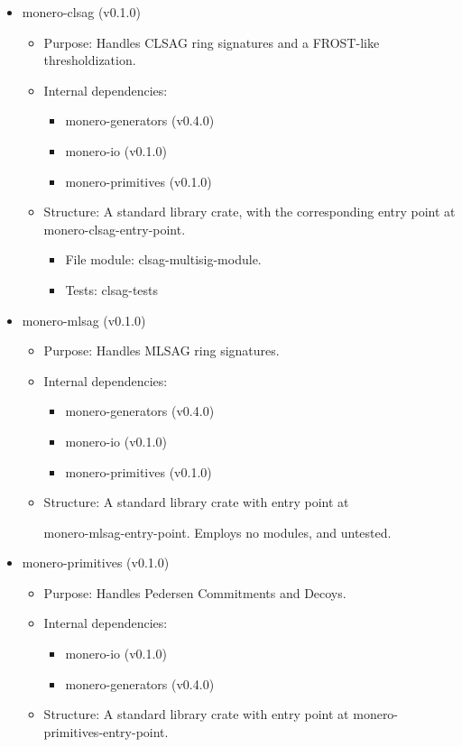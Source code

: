 \begin{itemize}
   
   \item \gls{monero-clsag (v0.1.0)}
   \begin{itemize}
   \item Purpose: Handles CLSAG ring signatures and a FROST-like thresholdization.
   \item Internal dependencies:
   \begin{itemize}
   \item \gls{monero-generators (v0.4.0)}
   \item \gls{monero-io (v0.1.0)}
   \item \gls{monero-primitives (v0.1.0)}
   \end{itemize}
   \item Structure: A standard library crate, with the corresponding entry point at \gls{monero-clsag-entry-point}.
   \begin{itemize}
   \item File module: \gls{clsag-multisig-module}.
   \item Tests: \gls{clsag-tests}
   \end{itemize}
   \end{itemize}
   
   \item \gls{monero-mlsag (v0.1.0)}
   \begin{itemize}
   \item Purpose: Handles MLSAG ring signatures.
   \item Internal dependencies:
   \begin{itemize}
   \item \gls{monero-generators (v0.4.0)}
   \item \gls{monero-io (v0.1.0)}
   \item \gls{monero-primitives (v0.1.0)}
   \end{itemize}
   \item Structure: A standard library crate with entry point at
   
   \gls{monero-mlsag-entry-point}. Employs no modules, and untested.
   \end{itemize}


   
 \item \gls{monero-primitives (v0.1.0)}
   \begin{itemize}
   \item Purpose: Handles Pedersen Commitments and Decoys.
   \item Internal dependencies:
   \begin{itemize}
   \item  \gls{monero-io (v0.1.0)} 
   \item \gls{monero-generators (v0.4.0)}
   \end{itemize}
   \item Structure: A standard library crate with entry point at \gls{monero-primitives-entry-point}. 
   \begin{itemize}
   

\end{itemize}
\end{itemize}
\end{itemize}
